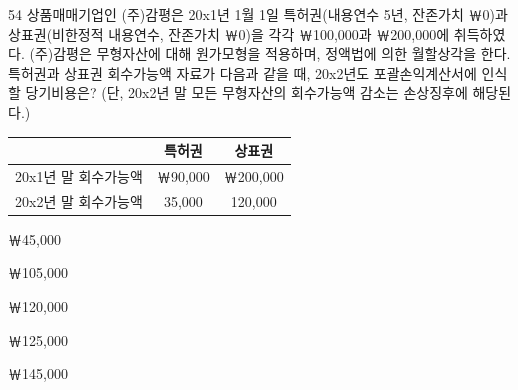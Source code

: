 \begin{question}{54}
상품매매기업인 (주)감평은 20x1년 1월 1일 특허권(내용연수 5년, 잔존가치 ￦0)과 상표권(비한정적 내용연수, 잔존가치 ￦0)을 각각 ￦100,000과 ￦200,000에 취득하였다. (주)감평은 무형자산에 대해 원가모형을 적용하며, 정액법에 의한 월할상각을 한다. 특허권과 상표권 회수가능액 자료가 다음과 같을 때, 20x2년도 포괄손익계산서에 인식할 당기비용은? (단, 20x2년 말 모든 무형자산의 회수가능액 감소는 손상징후에 해당된다.)
\par{\small\centering\begin{tabular}{|l|c|c|}
\hline
 & 특허권 & 상표권 \\ \hline
20x1년 말 회수가능액 & ￦90,000 & ￦200,000 \\ \hline
20x2년 말 회수가능액 & 35,000 & 120,000 \\ \hline
\end{tabular}\par}
\begin{choices}
  \item ￦45,000
  \item ￦105,000
  \item ￦120,000
  \item ￦125,000
  \item ￦145,000
\end{choices}
\end{question}
